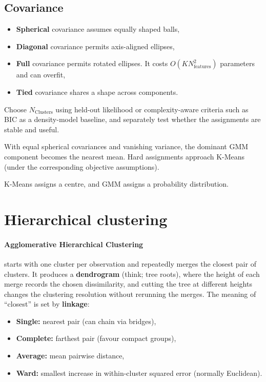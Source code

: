 \subsection{Covariance}
\begin{itemize}
    \item \textbf{Spherical} covariance assumes equally shaped balls, 
    \item \textbf{Diagonal} covariance permits axis-aligned ellipses, 
    \item \textbf{Full} covariance permits rotated ellipses.
    It costs $O(KN_{\text{features}}^2)$ parameters and can overfit, 
    \item \textbf{Tied} covariance shares a shape across components.
\end{itemize}

\begin{calloutpractical}
    Choose $N_{\text{Clusters}}$ using held-out likelihood or complexity-aware criteria such as BIC as a density-model baseline, and separately test whether the assignments are stable and useful.    
\end{calloutpractical}

\begin{calloutspecialcase}
    With equal spherical covariances and vanishing variance, the dominant GMM component becomes the nearest mean.
    Hard assignments approach K-Means (under the corresponding objective assumptions).
\end{calloutspecialcase}

\begin{calloutmemoryhook}
    K-Means assigns a centre, and GMM assigns a probability distribution.
\end{calloutmemoryhook}

\section{Hierarchical clustering}
\label{sec:hierarchical}
\paragraph{Agglomerative Hierarchical Clustering} starts with one cluster per observation and repeatedly merges the closest pair of clusters.
It produces a \textbf{dendrogram} (think; tree roots), where the height of each merge records the chosen dissimilarity, and cutting the tree at different heights changes the clustering resolution without rerunning the merges.
The meaning of ``closest'' is set by \textbf{linkage}: 
\begin{itemize}
    \item \textbf{Single:} nearest pair (can chain via bridges), 
    \item \textbf{Complete:} farthest pair (favour compact groups), 
    \item \textbf{Average:}  mean pairwise distance, 
    \item \textbf{Ward:} smallest increase in within-cluster squared error (normally Euclidean).
\end{itemize}

